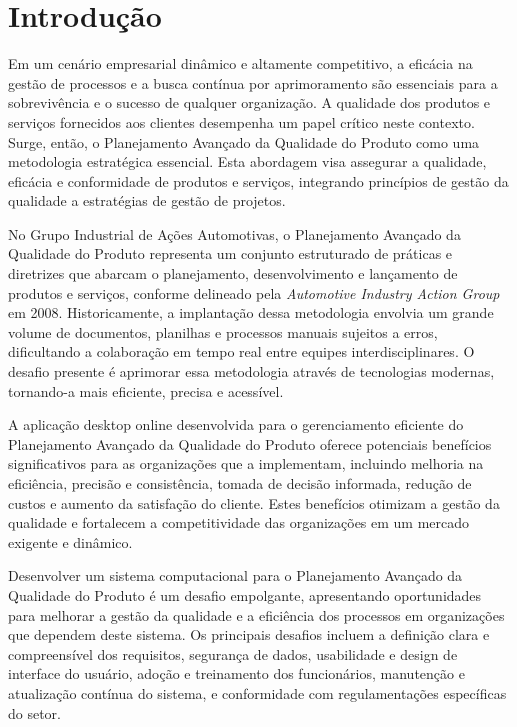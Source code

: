 \chapter{Introdução}
\label{cap:introducao}


Em um cenário empresarial dinâmico e altamente competitivo, a eficácia na gestão de processos e a busca contínua por aprimoramento são essenciais para a sobrevivência e o sucesso de qualquer organização. A qualidade dos produtos e serviços fornecidos aos clientes desempenha um papel crítico neste contexto. Surge, então, o Planejamento Avançado da Qualidade do Produto como uma metodologia estratégica essencial. Esta abordagem visa assegurar a qualidade, eficácia e conformidade de produtos e serviços, integrando princípios de gestão da qualidade a estratégias de gestão de projetos.

No Grupo Industrial de Ações Automotivas, o Planejamento Avançado da Qualidade do Produto representa um conjunto estruturado de práticas e diretrizes que abarcam o planejamento, desenvolvimento e lançamento de produtos e serviços, conforme delineado pela \textit{Automotive Industry Action Group} em 2008\cite{B0082OP29K:2009}. Historicamente, a implantação dessa metodologia envolvia um grande volume de documentos, planilhas e processos manuais sujeitos a erros, dificultando a colaboração em tempo real entre equipes interdisciplinares. O desafio presente é aprimorar essa metodologia através de tecnologias modernas, tornando-a mais eficiente, precisa e acessível.

A aplicação desktop online desenvolvida para o gerenciamento eficiente do Planejamento Avançado da Qualidade do Produto oferece potenciais benefícios significativos para as organizações que a implementam, incluindo melhoria na eficiência, precisão e consistência, tomada de decisão informada, redução de custos e aumento da satisfação do cliente. Estes benefícios otimizam a gestão da qualidade e fortalecem a competitividade das organizações em um mercado exigente e dinâmico.

Desenvolver um sistema computacional para o Planejamento Avançado da Qualidade do Produto é um desafio empolgante, apresentando oportunidades para melhorar a gestão da qualidade e a eficiência dos processos em organizações que dependem deste sistema. Os principais desafios incluem a definição clara e compreensível dos requisitos, segurança de dados, usabilidade e design de interface do usuário, adoção e treinamento dos funcionários, manutenção e atualização contínua do sistema, e conformidade com regulamentações específicas do setor.

